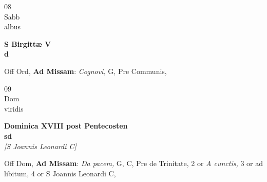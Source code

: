 \documentclass[10pt, openany]{book}
\begin{document}
        \begin{center}
            \begin{minipage}{3.5in}
                \vspace{2em}
                \begin{minipage}{0.5in}
                    {\Huge 08} \\
                    {\normalsize Sabb} \\
                    {\normalsize albus}
                \end{minipage}
                \begin{minipage}{3.0in}
                    \textbf{ \large S Birgittæ V \\
                    \textnormal{\normalsize d}} \\ 
                \end{minipage}
                \begin{justify}Off Ord, \textbf{Ad Missam}: \textit{Cognovi,} G, Pre Communis,   
                \end{justify}
            \end{minipage}
        \end{center}
    
        \begin{center}
            \begin{minipage}{3.5in}
                \vspace{2em}
                \begin{minipage}{0.5in}
                    {\Huge 09} \\
                    {\normalsize Dom} \\
                    {\normalsize viridis}
                \end{minipage}
                \begin{minipage}{3.0in}
                    \textbf{ \large Dominica XVIII post Pentecosten \\
                    \textnormal{\normalsize sd}} \\ \textit{[S Joannis Leonardi C]} \\ 
                \end{minipage}
                \begin{justify}Off Dom, \textbf{Ad Missam}: \textit{Da pacem,} G, C, Pre de Trinitate, 2 or \textit{A cunctis,} 3 or ad libitum, 4 or S Joannis Leonardi C,   
                \end{justify}
            \end{minipage}
        \end{center}
    
\end{document}
